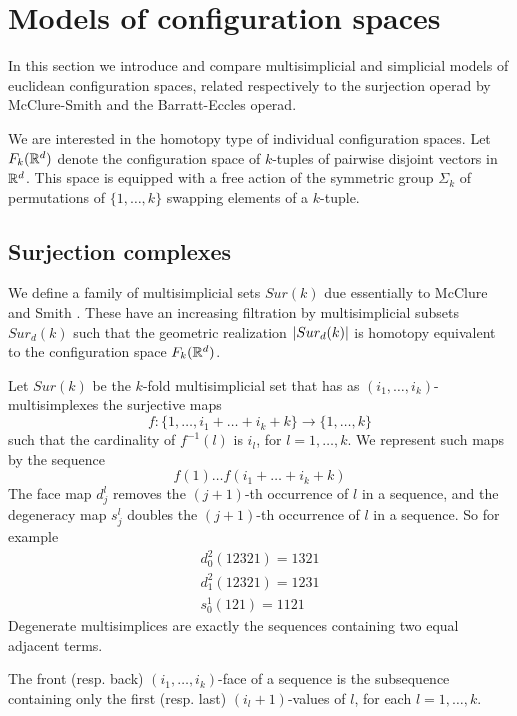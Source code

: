 
\section{Models of configuration spaces}

In this section we introduce and compare multisimplicial and  simplicial  models of euclidean configuration spaces,
related respectively to the surjection operad by McClure-Smith and the Barratt-Eccles operad.

We are interested in the homotopy type of individual configuration spaces. Let $F_k(\mathbb{R}^{d})$ denote the configuration space of $k$-tuples of pairwise disjoint vectors in $\mathbb{R}^{d}$. This space is equipped with a free action of the symmetric group $\Sigma_k$  of permutations of $\{1,\dots,k\}$ swapping elements of a $k$-tuple.


\subsection{Surjection complexes}
We define a family of multisimplicial sets  
$Sur(k)$ due essentially to McClure and Smith \cite{MS}.
These have an increasing filtration by multisimplicial subsets 
$Sur_d(k)$ such that the geometric realization 
$\lvert Sur_d(k)\rvert$ is homotopy equivalent to the configuration space
$F_k(\mathbb{R}^d)$.



\begin{definition}
Let $Sur(k)$  be the $k$-fold multisimplicial set that has
as $(i_1,\dots,i_k)$-multisimplexes
the surjective maps $$f:\{1,\dots,i_1+\dots+i_k+k\} \to  \{1,\dots,k\}$$ such that
the cardinality of $f^{-1}(l)$ is $i_l$, for $l=1,\dots,k$. We represent such maps by the sequence
$$f(1) \dots f(i_1+\dots+i_k+k)$$
The face map
$d^l_j$ removes the $(j+1)$-th occurrence of $l$ in a sequence, and the degeneracy map
$s^l_j$ doubles the $(j+1)$-th occurrence of $l$ in a sequence.
So for example
\begin{align*}d^2_0(12321)=1321 \\ d^2_1(12321)=1231 \\ s^1_0(121)=1121
\end{align*}
Degenerate multisimplices are exactly the sequences containing two equal adjacent terms.

The front  (resp. back) $(i_1,\dots,i_k)$-face of a sequence is the subsequence containing only the first (resp. last)
$(i_l+1)$-values of $l$, for each
$l=1,\dots,k$.
\end{definition}

